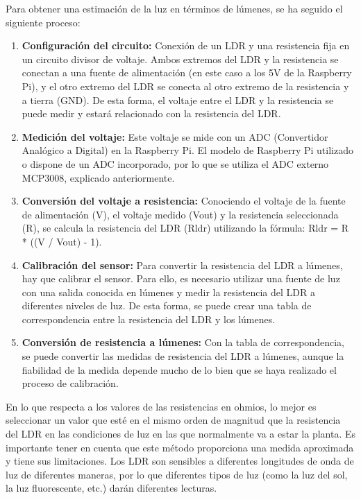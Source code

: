         Para obtener una estimación de la luz en términos de lúmenes, se ha seguido el siguiente proceso:    
        \begin{enumerate}    
            \item \textbf{Configuración del circuito:} Conexión de un LDR y una resistencia fija en un circuito divisor de voltaje. Ambos extremos del LDR y la resistencia se conectan a una fuente de alimentación (en este caso a los 5V de la Raspberry Pi), y el otro extremo del LDR se conecta al otro extremo de la resistencia y a tierra (GND). De esta forma, el voltaje entre el LDR y la resistencia se puede medir y estará relacionado con la resistencia del LDR.        
            \item \textbf{Medición del voltaje:} Este voltaje se mide con un ADC (Convertidor Analógico a Digital) en la Raspberry Pi. El modelo de Raspberry Pi utilizado o dispone de un ADC incorporado, por lo que se utiliza el ADC externo MCP3008, explicado anteriormente.        
            \item \textbf{Conversión del voltaje a resistencia:} Conociendo el voltaje de la fuente de alimentación (V), el voltaje medido (Vout) y la resistencia seleccionada (R), se calcula la resistencia del LDR (Rldr) utilizando la fórmula: Rldr = R * ((V / Vout) - 1).        
            \item \textbf{Calibración del sensor:} Para convertir la resistencia del LDR a lúmenes, hay que calibrar el sensor. Para ello, es necesario utilizar una fuente de luz con una salida conocida en lúmenes y medir la resistencia del LDR a diferentes niveles de luz. De esta forma, se puede crear una tabla de correspondencia entre la resistencia del LDR y los lúmenes.        
            \item \textbf{Conversión de resistencia a lúmenes:} Con la tabla de correspondencia, se puede convertir las medidas de resistencia del LDR a lúmenes, aunque la fiabilidad de la medida depende mucho de lo bien que se haya realizado el proceso de calibración.
        \end{enumerate}        
        En lo que respecta a los valores de las resistencias en ohmios, lo mejor es seleccionar un valor que esté en el mismo orden de magnitud que la resistencia del LDR en las condiciones de luz en las que normalmente va a estar la planta.
        Es importante tener en cuenta que este método proporciona una medida aproximada y tiene sus limitaciones. Los LDR son sensibles a diferentes longitudes de onda de luz de diferentes maneras, por lo que diferentes tipos de luz (como la luz del sol, la luz fluorescente, etc.) darán diferentes lecturas.
    
